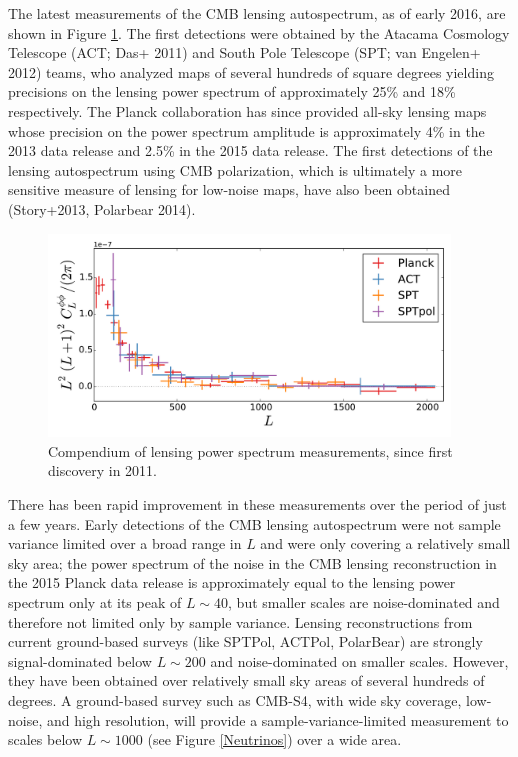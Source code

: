 The latest measurements of the CMB lensing autospectrum, as of early 2016, are shown in Figure \ref{CMBLensPower}. The first detections were obtained by the Atacama Cosmology Telescope (ACT; Das+ 2011) and South Pole Telescope  (SPT; van Engelen+ 2012) teams, who analyzed maps of several hundreds of square degrees yielding precisions on the lensing power spectrum of approximately 25\% and 18\% respectively.  The Planck collaboration has since provided all-sky lensing maps whose precision on the power spectrum amplitude is approximately 4\% in the 2013 data release and 2.5\% in the 2015 data release.  The first detections of the lensing autospectrum using CMB polarization, which is ultimately a more sensitive measure of lensing for low-noise maps,  have also been obtained (Story+2013, Polarbear 2014).

\begin{figure}[htbp]
\centering
\includegraphics[width=0.95\textwidth]{CMBLensing/autoCompilation}
\caption{Compendium of lensing power spectrum measurements, since first discovery in 2011.  }
\label{CMBLensPower}
\end{figure}

There has been rapid improvement in these measurements over the period of just a few years. 
Early detections of the CMB lensing autospectrum were not sample variance limited over a broad range in $L$ and were only covering a relatively small sky area;  
the  power spectrum of the noise in the CMB lensing reconstruction  in the 2015 Planck data release is approximately equal to the lensing power spectrum only at its peak of $L \sim 40$, but smaller scales are noise-dominated and therefore not limited only by sample variance.  Lensing reconstructions from current ground-based surveys (like SPTPol, ACTPol, PolarBear) 
are strongly signal-dominated below $L \sim 200$ and noise-dominated on smaller scales.  However, they have been obtained over relatively small sky areas of several hundreds of degrees. A ground-based survey such as CMB-S4, with wide sky coverage, low-noise, and high resolution, will provide a sample-variance-limited measurement to scales below $L \sim 1000$ (see Figure \ref{Neutrinos}) over a wide area.  
 


